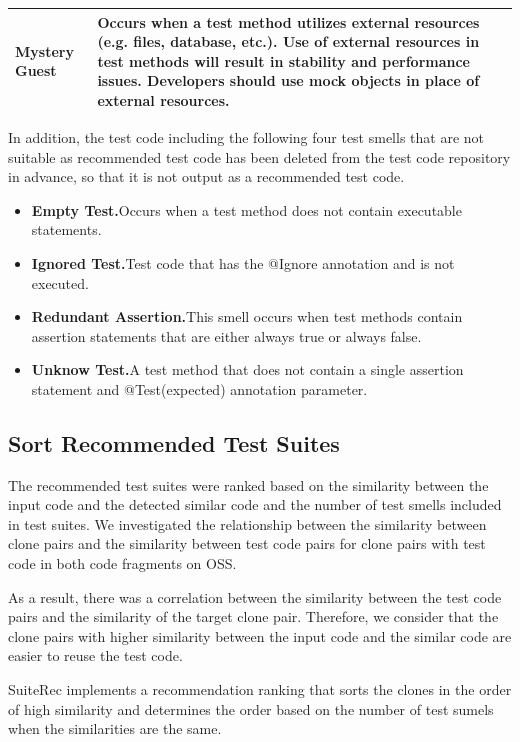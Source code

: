 \documentclass[conference]{IEEEtran}
\begin{document}
\begin{table}[hbtp]
\begin{tabular}{|l|p{5.2cm}|}
\textbf{Mystery Guest}          & Occurs when a test method utilizes external resources (e.g. files, database, etc.). Use of external resources in test methods will result in stability and performance issues. Developers should use mock objects in place of external resources. \\ \hline
\end{tabular}
\end{table}

In addition, the test code including the following four test smells that are not suitable as recommended test code has been deleted from the test code repository in advance, so that it is not output as a recommended test code.　

\begin{itemize}
\item \textbf{Empty Test.}Occurs when a test method does not contain executable statements.
\item \textbf{Ignored Test.}Test code that has the @Ignore annotation and is not executed.
\item \textbf{Redundant Assertion.}This smell occurs when test methods contain assertion statements that are either always true or always false. 
\item \textbf{Unknow Test.}A test method that does not contain a single assertion statement and @Test(expected) annotation parameter.
\end{itemize}

\subsection{Sort Recommended Test Suites}
The recommended test suites were ranked based on the similarity between the input code and the detected similar code and the number of test smells included in test suites. We investigated the relationship between the similarity between clone pairs and the similarity between test code pairs for clone pairs with test code in both code fragments on OSS.

As a result, there was a correlation between the similarity between the test code pairs and the similarity of the target clone pair. Therefore, we consider that the clone pairs with higher similarity between the input code and the similar code are easier to reuse the test code.

SuiteRec implements a recommendation ranking that sorts the clones in the order of high similarity and determines the order based on the number of test sumels when the similarities are the same.
\end{document}
